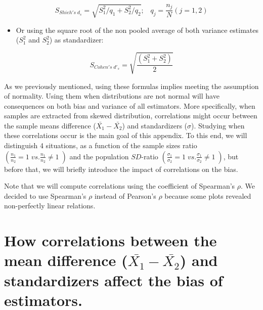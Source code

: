 \documentclass[
  man]{apa6}
\providecommand{\tightlist}{%
  \setlength{\itemsep}{0pt}\setlength{\parskip}{0pt}}
\begin{document}
\begin{equation} 
S_{Shieh's \; d_s} = \sqrt{S_1^2/q_1+S_2^2/q_2}; \;\;\; q_j=\frac{n_j}{N} (j=1,2)
\label{eq:Shiehds}
\end{equation}

\begin{itemize}
\tightlist
\item
  Or using the square root of the non pooled average of both variance estimates (\(S^2_1\) and \(S^2_2\)) as standardizer:
\end{itemize}

\begin{equation} 
S_{Cohen's \; d'_s} = \sqrt{\frac{\left(S^2_{1}+S^2_{2} \right)}{2}}
\label{eq:cohenprimeds}
\end{equation}

As we previously mentioned, using these formulas implies meeting the assumption of normality. Using them when distributions are not normal will have consequences on both bias and variance of all estimators. More specifically, when samples are extracted from skewed distribution, correlations might occur between the sample means difference (\(\bar{X_1}-\bar{X_2}\)) and standardizers (\(\sigma\)). Studying when these correlations occur is the main goal of this appendix. To this end, we will distinguish 4 situations, as a function of the sample sizes ratio \(\left( \frac{n_1}{n_2}=1 \; vs. \frac{n_1}{n_2}\neq1\; \right)\) and the population \(SD\)-ratio \(\left( \frac{\sigma_1}{\sigma_2}=1 \; vs. \frac{\sigma_1}{\sigma_2}\neq1\; \right)\), but before that, we will briefly introduce the impact of correlations on the bias.

Note that we will compute correlations using the coefficient of Spearman's \(\rho\). We decided to use Spearman's \(\rho\) instead of Pearson's \(\rho\) because some plots revealed non-perfectly linear relations.

\hypertarget{how-correlations-between-the-mean-difference-barx_1-barx_2-and-standardizers-affect-the-bias-of-estimators.}{%
\section{\texorpdfstring{How correlations between the mean difference (\(\bar{X_1}-\bar{X_2}\)) and standardizers affect the bias of estimators.}{How correlations between the mean difference (\textbackslash bar\{X\_1\}-\textbackslash bar\{X\_2\}) and standardizers affect the bias of estimators.}}\label{how-correlations-between-the-mean-difference-barx_1-barx_2-and-standardizers-affect-the-bias-of-estimators.}}
\end{document}
